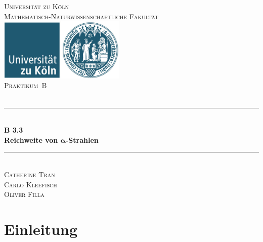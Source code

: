 \documentclass[12pt,a4paper]{scrartcl}
\numberwithin{equation}{section} %
\newcommand{\HRule}{\rule{\linewidth}{0.7mm}}
\renewcommand{\[}{} %
\renewcommand{\]}{\noindent} %
\begin{document}
\begin{titlepage}
	\pagestyle{empty}

	\begin{center}

	\textsc{\LARGE Universität zu Köln }\\ [0.4cm]
	\textsc{Mathematisch-Naturwissenschaftliche Fakultät} \\[1.5cm]

	\includegraphics[width=0.45\textwidth]{../media/uni.jpg}\\[1.5cm]  %

	\textsc{\Large Praktikum~B}\\[2mm]
	\textsc{}\\[10mm]
	\HRule \\[0.4cm]

		{	\Huge \bfseries B 3.3}\\[0.4cm]
			{	\huge \bfseries Reichweite von \(\pmb{\alpha}\)-Strahlen}\\[0.3cm]
	
	\HRule \\[3cm]

		\textsc{\Large Catherine Tran } \\[3pt]
		\textsc{\Large Carlo Kleefisch } \\[3pt]
		\textsc{\Large Oliver Filla } \\[3pt]
		
	\end{center}
\end{titlepage}

\newpage
\tableofcontents
\newpage

\hypertarget{einleitung}{%
\section{Einleitung}\label{einleitung}}
\end{document}

